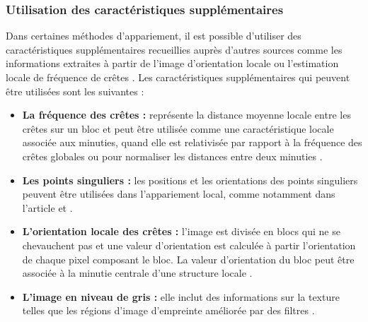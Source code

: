 \subsubsection{Utilisation des caractéristiques supplémentaires}
Dans certaines méthodes d'appariement, il est possible d'utiliser des caractéristiques supplémentaires recueillies auprès d'autres sources comme les informations extraites à partir de l'image d'orientation locale ou l'estimation locale de fréquence de crêtes \citep{Peralta2015a}. Les caractéristiques supplémentaires qui peuvent être utilisées sont les suivantes :
\begin{itemize}
	\item \textbf{La fréquence des crêtes : }représente la distance moyenne locale entre les crêtes sur un bloc et peut être utilisée comme une caractéristique locale associée aux minuties, quand elle est relativisée par rapport à la fréquence des crêtes globales ou pour normaliser les distances entre deux minuties \citep{chikkerur2007fingerprint}.
	\item \textbf{Les points singuliers :} les positions et les orientations des points singuliers peuvent être utilisées dans l'appariement local, comme notamment dans l'article \citep{zhang2002core} et \citep{feng2008combining}.
	\item \textbf{L'orientation locale des crêtes :} l'image est divisée en blocs qui ne se chevauchent pas et une valeur d'orientation est calculée à partir l'orientation de chaque pixel composant le bloc. La valeur d'orientation du bloc peut être associée à la minutie centrale d'une structure locale \citep{maltoni2009handbook}. 
	\item \textbf{L'image en niveau de gris :} elle inclut des informations sur la texture telles que les régions d'image d'empreinte améliorée par des filtres \citep{Peralta2015a}.
\end{itemize}
